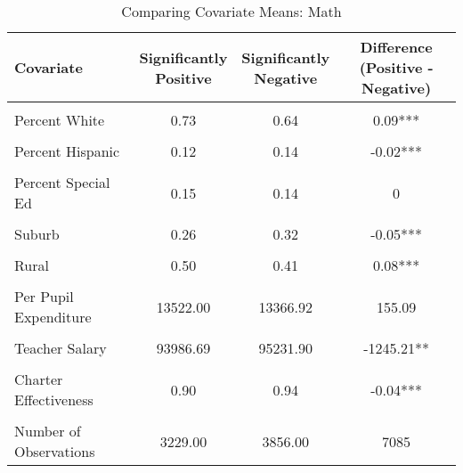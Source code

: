 \begin{table}[H]%
\centering
\caption{\label{tab:cov_means_math}Comparing Covariate Means: Math}
\centering
\begin{tabular}[t]{lccc}
\toprule
Covariate & \makecell[c]{Significantly\\Positive} & \makecell[c]{Significantly\\Negative} & \makecell[c]{Difference\\(Positive - Negative)}\\
\midrule
\cellcolor{gray!10}{Log of Enrollment} & \cellcolor{gray!10}{7.36} & \cellcolor{gray!10}{7.56} & \cellcolor{gray!10}{-0.19***}\\
Percent White & 0.73 & 0.64 & 0.09***\\
\cellcolor{gray!10}{Percent Black} & \cellcolor{gray!10}{0.08} & \cellcolor{gray!10}{0.14} & \cellcolor{gray!10}{-0.06***}\\
Percent Hispanic & 0.12 & 0.14 & -0.02***\\
\cellcolor{gray!10}{Percent Free/Reduced Lunch} & \cellcolor{gray!10}{0.48} & \cellcolor{gray!10}{0.53} & \cellcolor{gray!10}{-0.05***}\\
Percent Special Ed & 0.15 & 0.14 & 0\\
\cellcolor{gray!10}{Urban} & \cellcolor{gray!10}{0.05} & \cellcolor{gray!10}{0.09} & \cellcolor{gray!10}{-0.04***}\\
Suburb & 0.26 & 0.32 & -0.05***\\
\cellcolor{gray!10}{Town} & \cellcolor{gray!10}{0.19} & \cellcolor{gray!10}{0.18} & \cellcolor{gray!10}{0.01}\\
Rural & 0.50 & 0.41 & 0.08***\\
\cellcolor{gray!10}{Per Pupil Revenue} & \cellcolor{gray!10}{13600.00} & \cellcolor{gray!10}{13496.22} & \cellcolor{gray!10}{103.78}\\
Per Pupil Expenditure & 13522.00 & 13366.92 & 155.09\\
\cellcolor{gray!10}{Student-Teacher Ratio} & \cellcolor{gray!10}{14.82} & \cellcolor{gray!10}{15.29} & \cellcolor{gray!10}{-0.47***}\\
Teacher Salary & 93986.69 & 95231.90 & -1245.21**\\
\cellcolor{gray!10}{Number of Magnet Schools} & \cellcolor{gray!10}{0.22} & \cellcolor{gray!10}{0.58} & \cellcolor{gray!10}{-0.36***}\\
Charter Effectiveness & 0.90 & 0.94 & -0.04***\\
\cellcolor{gray!10}{Baseline Performance} & \cellcolor{gray!10}{0.14} & \cellcolor{gray!10}{-0.09} & \cellcolor{gray!10}{0.23***}\\
\midrule
Number of Observations & 3229.00 & 3856.00 & 7085\\
\bottomrule
\end{tabular}
\end{table}
